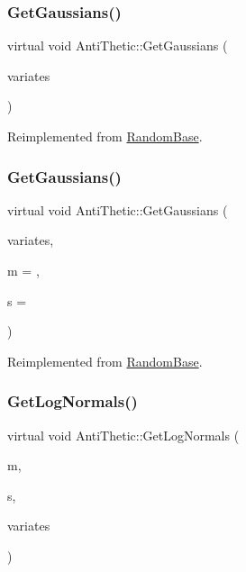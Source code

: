 \subsubsection{\texorpdfstring{Get\+Gaussians()}{GetGaussians()}\hspace{0.1cm}{\footnotesize\ttfamily [1/2]}}
{\footnotesize\ttfamily virtual void Anti\+Thetic\+::\+Get\+Gaussians (\begin{DoxyParamCaption}\item[{\hyperlink{classMJArray}{M\+J\+Array} \&}]{variates }\end{DoxyParamCaption})\hspace{0.3cm}{\ttfamily [virtual]}}



Reimplemented from \hyperlink{classRandomBase_aac297a1b64959492831f5e9a1f28c03d}{Random\+Base}.

\hypertarget{classAntiThetic_a82340ce519d6dbdf75f6270193eea703}{}\label{classAntiThetic_a82340ce519d6dbdf75f6270193eea703} 
\subsubsection{\texorpdfstring{Get\+Gaussians()}{GetGaussians()}\hspace{0.1cm}{\footnotesize\ttfamily [2/2]}}
{\footnotesize\ttfamily virtual void Anti\+Thetic\+::\+Get\+Gaussians (\begin{DoxyParamCaption}\item[{std\+::vector$<$ double $>$ \&}]{variates,  }\item[{double}]{m = {},  }\item[{double}]{s = {} }\end{DoxyParamCaption})\hspace{0.3cm}{\ttfamily [virtual]}}



Reimplemented from \hyperlink{classRandomBase_a8428b19f897b202363c12df1471a8d52}{Random\+Base}.

\hypertarget{classAntiThetic_ad14fda6b35f6370d744d0ea53d5b80ba}{}\label{classAntiThetic_ad14fda6b35f6370d744d0ea53d5b80ba} 
\subsubsection{\texorpdfstring{Get\+Log\+Normals()}{GetLogNormals()}}
{\footnotesize\ttfamily virtual void Anti\+Thetic\+::\+Get\+Log\+Normals (\begin{DoxyParamCaption}\item[{double}]{m,  }\item[{double}]{s,  }\item[{\hyperlink{classMJArray}{M\+J\+Array} \&}]{variates }\end{DoxyParamCaption})\hspace{0.3cm}{\ttfamily [virtual]}}



